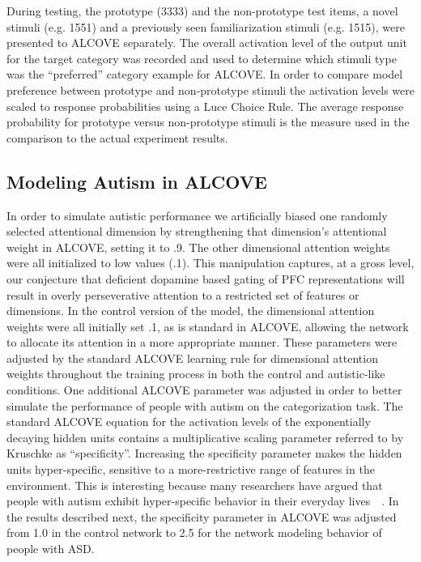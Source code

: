 During testing, the prototype (3333) and the non-prototype test items, a novel stimuli (e.g. 1551) and a previously seen familiarization stimuli (e.g. 1515), were presented to ALCOVE separately.  The overall activation level of the output unit for the target category was recorded and used to determine which stimuli type was the ``preferred'' category example for ALCOVE. In order to compare model preference between prototype and non-prototype stimuli the activation levels were scaled to response probabilities using a Luce Choice Rule.   The average response probability for prototype versus non-prototype stimuli is the measure used in the comparison to the actual experiment results. 

\subsection{Modeling Autism in ALCOVE}
In order to simulate autistic performance we artificially biased one randomly selected attentional dimension by strengthening that dimension's attentional weight in ALCOVE, setting it to .9.  The other dimensional attention weights were all initialized to low values (.1).  This manipulation captures, at a gross level, our conjecture that deficient dopamine based gating of PFC representations will result in overly perseverative attention to a restricted set of features or dimensions.  In the control version of the model, the dimensional attention weights were all initially set .1, as is standard in ALCOVE, allowing the network to allocate its attention in a more appropriate manner.  These parameters were adjusted by the standard ALCOVE learning rule for dimensional attention weights throughout the training process in both the control and autistic-like conditions.  One additional ALCOVE parameter was adjusted in order to better simulate the performance of people with autism on the categorization task.  The standard ALCOVE equation for the activation levels of the exponentially decaying hidden units contains a multiplicative scaling parameter referred to  by Kruschke as ``specificity''.  Increasing the specificity parameter makes the hidden units hyper-specific, sensitive to a more-restrictive range of features in the environment.  This is interesting because many researchers have argued that people with autism exhibit hyper-specific behavior in their everyday lives~~\cite{McClellandJL:2000:Autism,HappeF:1999:WCC}.  In the results described next, the specificity parameter in ALCOVE was adjusted from 1.0 in the control network to 2.5 for the network modeling behavior of people with ASD.  

